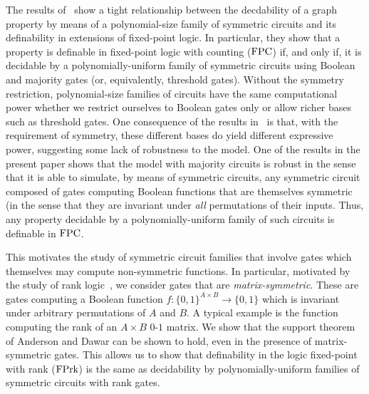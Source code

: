 \documentclass[../paper.tex]{subfiles}
\begin{document}
The results of~\cite{AndersonD17} show a tight relationship between the
decdability of a graph property by means of a polynomial-size family of
symmetric circuits and its definability in extensions of fixed-point logic. In
particular, they show that a property is definable in fixed-point logic with
counting ($\text{\upshape FPC}$) if, and only if, it is decidable by a polynomially-uniform
family of symmetric circuits using Boolean and majority gates (or, equivalently,
threshold gates). Without the symmetry restriction, polynomial-size families of
circuits have the same computational power whether we restrict ourselves to
Boolean gates only or allow richer bases such as threshold gates. One
consequence of the results in~\cite{AD14} is that, with the requirement of
symmetry, these different bases do yield different expressive power, suggesting
some lack of robustness to the model. One of the results in the present paper
shows that the model with majority circuits is robust in the sense that it is
able to simulate, by means of symmetric circuits, any symmetric circuit composed
of gates computing Boolean functions that are themselves symmetric (in the sense
that they are invariant under \emph{all} permutations of their inputs. Thus, any
property decidable by a polynomially-uniform family of such circuits is
definable in $\text{\upshape FPC}$.

This motivates the study of symmetric circuit families that involve gates which
themselves may compute non-symmetric functions. In particular, motivated by the
study of rank logic~\cite{DGHL09,GP15}, we consider gates that are
\emph{matrix-symmetric}. These are gates computing a Boolean function $f:
\{0,1\}^{A \times B} \rightarrow \{0,1\}$ which is invariant under arbitrary
permutations of $A$ and $B$. A typical example is the function computing the
rank of an $A \times B$ $0$-$1$ matrix. We show that the support theorem of
Anderson and Dawar can be shown to hold, even in the presence of
matrix-symmetric gates. This allows us to show that definability in the logic
fixed-point with rank ($\text{\upshape FPrk}$) is the same as decidability by
polynomially-uniform families of symmetric circuits with rank gates.
\end{document}
